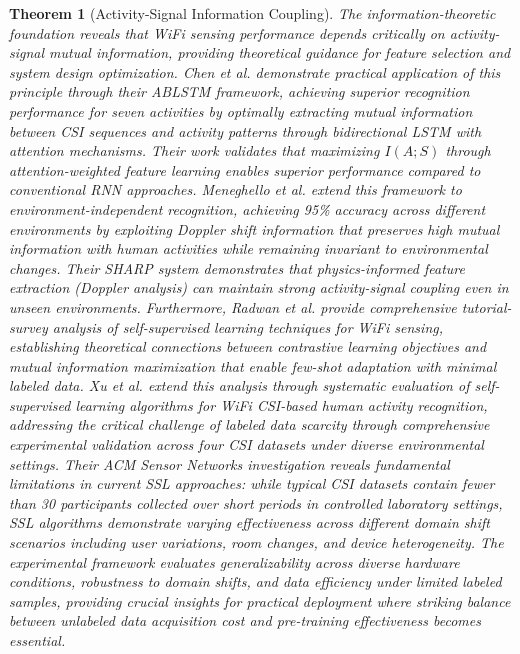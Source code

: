 \documentclass[journal]{IEEEtran}
\newtheorem{theorem}{Theorem}
\begin{document}
\begin{theorem}[Activity-Signal Information Coupling]
The information-theoretic foundation reveals that WiFi sensing performance depends critically on activity-signal mutual information, providing theoretical guidance for feature selection and system design optimization. Chen et al. \cite{chen2018wifi} demonstrate practical application of this principle through their ABLSTM framework, achieving superior recognition performance for seven activities by optimally extracting mutual information between CSI sequences and activity patterns through bidirectional LSTM with attention mechanisms. Their work validates that maximizing $I(A;S)$ through attention-weighted feature learning enables superior performance compared to conventional RNN approaches. Meneghello et al. \cite{meneghello2022sharp} extend this framework to environment-independent recognition, achieving 95\% accuracy across different environments by exploiting Doppler shift information that preserves high mutual information with human activities while remaining invariant to environmental changes. Their SHARP system demonstrates that physics-informed feature extraction (Doppler analysis) can maintain strong activity-signal coupling even in unseen environments. Furthermore, Radwan et al. \cite{radwan2025tutorial} provide comprehensive tutorial-survey analysis of self-supervised learning techniques for WiFi sensing, establishing theoretical connections between contrastive learning objectives and mutual information maximization that enable few-shot adaptation with minimal labeled data. Xu et al. \cite{xu2025evaluating} extend this analysis through systematic evaluation of self-supervised learning algorithms for WiFi CSI-based human activity recognition, addressing the critical challenge of labeled data scarcity through comprehensive experimental validation across four CSI datasets under diverse environmental settings. Their ACM Sensor Networks investigation reveals fundamental limitations in current SSL approaches: while typical CSI datasets contain fewer than 30 participants collected over short periods in controlled laboratory settings, SSL algorithms demonstrate varying effectiveness across different domain shift scenarios including user variations, room changes, and device heterogeneity. The experimental framework evaluates generalizability across diverse hardware conditions, robustness to domain shifts, and data efficiency under limited labeled samples, providing crucial insights for practical deployment where striking balance between unlabeled data acquisition cost and pre-training effectiveness becomes essential.
\end{theorem}
\end{document}
